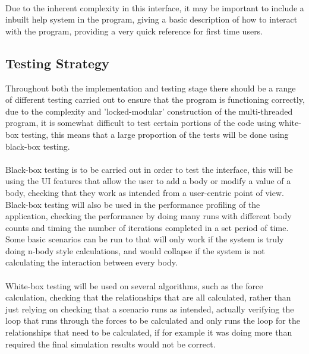 \paragraph{}
Due to the inherent complexity in this interface, it may be important to include a inbuilt help system in the program, giving a basic description of how to interact with the program, providing a very quick reference for first time users.

\pagebreak
\subsection{Testing Strategy}
Throughout both the implementation and testing stage there should be a range of different testing carried out to ensure that the program is functioning correctly, due to the complexity and 'locked-modular' construction of the multi-threaded program, it is somewhat difficult to test certain portions of the code using white-box testing, this means that a large proportion of the tests will be done using black-box testing.

\paragraph{}
Black-box testing is to be carried out in order to test the interface, this will be using the UI features that allow the user to add a body or modify a value of a body, checking that they work as intended from a user-centric point of view. Black-box testing will also be used in the performance profiling of the application, checking the performance by doing many runs with different body counts and timing the number of iterations completed in a set period of time. Some basic scenarios can be run to that will only work if the system is truly doing n-body style calculations, and would collapse if the system is not calculating the interaction between every body.

\paragraph{}
White-box testing will be used on several algorithms, such as the force calculation, checking that the relationships that are all calculated, rather than just relying on checking that a scenario runs as intended, actually verifying the loop that runs through the forces to be calculated and only runs the loop for the relationships that need to be calculated, if for example it was doing more than required the final simulation results would not be correct.

